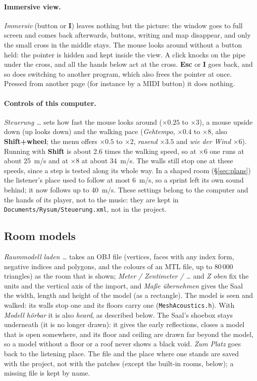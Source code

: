 \documentclass[11pt,a4paper,parskip=half,DIV=11,toc=bibliography]{scrartcl}
\newcommand{\ui}[1]{\emph{#1}}                 %
\newcommand{\fn}[1]{\mbox{\texttt{#1}}}
\begin{document}
\paragraph{Immersive view.} \ui{Immersiv} (button or \textbf{I}) leaves nothing but the picture: the window goes to full screen and comes back
afterwards, buttons, writing and map disappear, and only the small cross in the middle stays. The mouse looks around without a button
held: the pointer is hidden and kept inside the view. A click knocks on the pipe under the cross, and all the hands below act at the cross.
\textbf{Esc} or \textbf{I} goes back, and so does switching to another program, which also frees the pointer at once. Pressed from another page
(for instance by a MIDI button) it does nothing.

\paragraph{Controls of this computer.} \ui{Steuerung \dots} sets how fast the mouse looks around ($\times0.25$ to $\times3$), a mouse upside down
(up looks down) and the walking pace (\ui{Gehtempo}, $\times0.4$ to $\times8$, also \textbf{Shift+wheel}; the menu offers $\times0.5$ to $\times2$, \ui{rasend}
$\times3.5$ and \ui{wie der Wind} $\times6$). Running with \textbf{Shift} is about 2.6 times the walking speed, so at $\times6$ one runs at about
\SI{25}{m/s} and at $\times8$ at about \SI{34}{m/s}. The walls still stop one at these speeds, since a step is tested along its whole way. In a shaped room
(\S\ref{sec:plans}) the listener's place used to follow at most \SI{6}{m/s}, so a sprint left its own sound behind; it now follows up to \SI{40}{m/s}.
These settings belong to the computer and the hands of its player, not to the music: they are kept in \fn{Documents/Rysum/Steuerung.xml}, not in the project.

\subsection{Room models}
\label{sec:models}
\ui{Raummodell laden \dots} takes an OBJ file (vertices, faces with any index form, negative indices and polygons, and the
colours of an MTL file, up to 80\,000 triangles) as the room that is shown; \ui{Meter / Zentimeter / \dots} and \ui{Z oben} fix the
units and the vertical axis of the import, and \ui{Maße übernehmen} gives the Saal the width, length and height of the
model (as a rectangle). The model is seen and walked: its walls stop one and its floors carry one (\fn{MeshAcoustics.h}). With \ui{Modell hörbar} it is also
\emph{heard}, as described below. The Saal's shoebox stays underneath (it is no longer drawn): it gives the early
reflections, closes a model that is open somewhere, and its floor and ceiling are drawn far beyond the model, so a model without
a floor or a roof never shows a black void. \ui{Zum Platz} goes back to the listening place. The file and the place where one stands are saved with the project, not with the
patches (except the built-in rooms, below); a missing file is kept by name.
\end{document}
